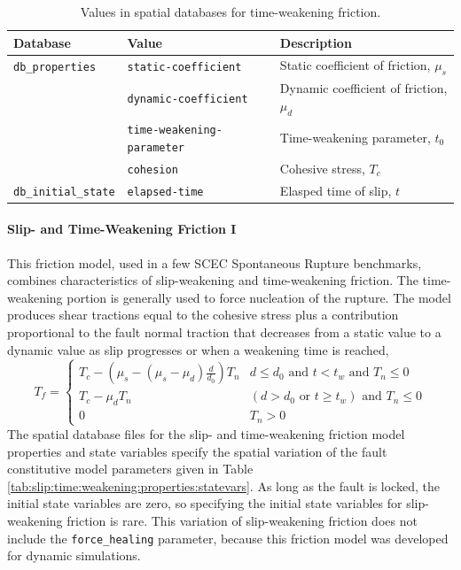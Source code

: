 \noindent \begin{center}
\begin{table}[H]
\noindent \centering{}\caption{\label{tab:time:weakening:properties:statevars}Values in spatial
databases for time-weakening friction.}
\medskip{}
\begin{tabular}{|l|l|>{\raggedright}p{2.5in}|}
\hline 
\textbf{Database} & \textbf{Value} & \textbf{Description}\tabularnewline
\hline 
\hline 
\texttt{db\_properties} & \texttt{static-coefficient} & Static coefficient of friction, $\mu_{s}$\tabularnewline
\cline{2-3} 
 & \texttt{dynamic-coefficient} & Dynamic coefficient of friction, $\mu_{d}$\tabularnewline
\cline{2-3} 
 & \texttt{time-weakening-parameter} & Time-weakening parameter, $t_{0}$\tabularnewline
\cline{2-3} 
 & \texttt{cohesion} & Cohesive stress, $T_{c}$\tabularnewline
\hline 
\texttt{db\_initial\_state} & \texttt{elapsed-time} & Elasped time of slip, $t$\tabularnewline
\hline 
\end{tabular}
\end{table}

\par\end{center}


\paragraph{\label{sec:friction:slip:time:weakening}Slip- and Time-Weakening
Friction I}

This friction model, used in a few SCEC Spontaneous Rupture benchmarks,
combines characteristics of slip-weakening and time-weakening friction.
The time-weakening portion is generally used to force nucleation of
the rupture. The model produces shear tractions equal to the cohesive
stress plus a contribution proportional to the fault normal traction
that decreases from a static value to a dynamic value as slip progresses
or when a weakening time is reached,
\begin{equation}
T_{f}=\begin{cases}
T_{c}-(\mu_{s}-(\mu_{s}-\mu_{d})\frac{d}{d_{0}})T_{n} & d\leq d_{0}\text{ and }t<t_{w}\text{ and }T_{n}\leq0\\
T_{c}-\mu_{d}T_{n} & (d>d_{0}\text{ or }t\ge t_{w})\text{ and }T_{n}\leq0\\
0 & T_{n}>0
\end{cases}
\end{equation}
The spatial database files for the slip- and time-weakening friction
model properties and state variables specify the spatial variation
of the fault constitutive model parameters given in Table \vref{tab:slip:time:weakening:properties:statevars}.
As long as the fault is locked, the initial state variables are zero,
so specifying the initial state variables for slip-weakening friction
is rare. This variation of slip-weakening friction does not include
the \texttt{force\_healing} parameter, because this friction model
was developed for dynamic simulations.

